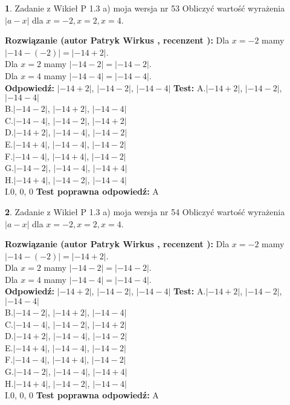 \documentclass[12pt, a4paper]{article}
\theoremstyle{definition} %
\newtheorem{zad}{}
\newcommand{\zadStart}[1]{\begin{zad}#1\newline}
\newcommand{\zadStop}{\end{zad}}
\newcommand{\rozwStart}[2]{\noindent \textbf{Rozwiązanie (autor #1 , recenzent #2): }\newline}
\newcommand{\rozwStop}{\newline}
\newcommand{\odpStart}{\noindent \textbf{Odpowiedź:}\newline}
\newcommand{\odpStop}{\newline}
\newcommand{\testStart}{\noindent \textbf{Test:}\newline}
\newcommand{\testStop}{\newline}
\newcommand{\kluczStart}{\noindent \textbf{Test poprawna odpowiedź:}\newline}
\newcommand{\kluczStop}{\newline}
\begin{document}
\zadStart{Zadanie z Wikieł P 1.3 a) moja wersja nr 53}
Obliczyć wartość wyrażenia $|a - x|$ dla $x=-2,x=2,x=4$.
\zadStop
\rozwStart{Patryk Wirkus}{}
Dla $x = -2$ mamy $|-14 - (-2)| = |-14 + 2|$.\\
Dla $x = 2$ mamy $|-14 - 2| = |-14 - 2|$.\\
Dla $x = 4$ mamy $|-14 - 4| = |-14 - 4|$.\\
\rozwStop
\odpStart
$|-14 + 2|$, $|-14 - 2|$, $|-14 - 4|$
\odpStop
\testStart
A.$|-14 + 2|$, $|-14 - 2|$, $|-14 - 4|$\\
B.$|-14 - 2|$, $|-14 + 2|$, $|-14 - 4|$\\
C.$|-14 - 4|$, $|-14 - 2|$, $|-14 + 2|$\\
D.$|-14 + 2|$, $|-14 - 4|$, $|-14 - 2|$\\
E.$|-14 + 4|$, $|-14 - 4|$, $|-14 - 2|$\\
F.$|-14 - 4|$, $|-14 + 4|$, $|-14 - 2|$\\
G.$|-14 - 2|$, $|-14 - 4|$, $|-14 + 4|$\\
H.$|-14 + 4|$, $|-14 - 2|$, $|-14 - 4|$\\
I.$0$, $0$, $0$
\testStop
\kluczStart
A
\kluczStop



\zadStart{Zadanie z Wikieł P 1.3 a) moja wersja nr 54}
Obliczyć wartość wyrażenia $|a - x|$ dla $x=-2,x=2,x=4$.
\zadStop
\rozwStart{Patryk Wirkus}{}
Dla $x = -2$ mamy $|-14 - (-2)| = |-14 + 2|$.\\
Dla $x = 2$ mamy $|-14 - 2| = |-14 - 2|$.\\
Dla $x = 4$ mamy $|-14 - 4| = |-14 - 4|$.\\
\rozwStop
\odpStart
$|-14 + 2|$, $|-14 - 2|$, $|-14 - 4|$
\odpStop
\testStart
A.$|-14 + 2|$, $|-14 - 2|$, $|-14 - 4|$\\
B.$|-14 - 2|$, $|-14 + 2|$, $|-14 - 4|$\\
C.$|-14 - 4|$, $|-14 - 2|$, $|-14 + 2|$\\
D.$|-14 + 2|$, $|-14 - 4|$, $|-14 - 2|$\\
E.$|-14 + 4|$, $|-14 - 4|$, $|-14 - 2|$\\
F.$|-14 - 4|$, $|-14 + 4|$, $|-14 - 2|$\\
G.$|-14 - 2|$, $|-14 - 4|$, $|-14 + 4|$\\
H.$|-14 + 4|$, $|-14 - 2|$, $|-14 - 4|$\\
I.$0$, $0$, $0$
\testStop
\kluczStart
A
\kluczStop
\end{document}
